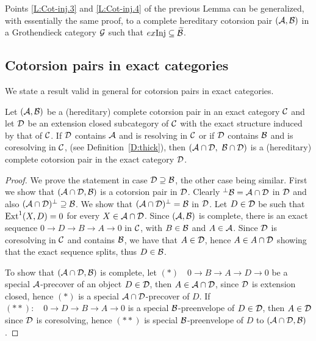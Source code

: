 Points \ref{L:Cot-inj.3} and \ref{L:Cot-inj.4} of the previous Lemma can be generalized, with essentially the same proof, to a complete hereditary cotorsion pair $(\mathcal{A},\mathcal{B})$ in a Grothendieck category $\mathcal{G}$ such that $ex \mathrm{Inj}\subseteq \widetilde{\mathcal{B}}$.

%
%
%
%
%
%
%
%
%
%
%
%
%
%
%
%


 \subsection{Cotorsion pairs in exact categories}

 We state a result valid in general for cotorsion pairs in exact categories.
 \begin{prop}\label{P:inducing} Let $(\mathcal{A}, \mathcal{B})$ be a (hereditary) complete cotorsion pair in an exact category $\mathcal{C}$ and let $\mathcal{D}$ be an extension closed subcategory of $\mathcal{C}$ with the exact structure induced by that of $\mathcal{C}$. If $\mathcal{D}$ contains $\mathcal{A}$ and is resolving in $\mathcal{C}$ or if $\mathcal{D}$ contains $\mathcal{B}$ and is coresolving in $\mathcal{C}$, (see Definition~\ref{D:thick}), then $(\mathcal{A}\cap\mathcal{D}, \ \mathcal{B}\cap\mathcal{D})$ is a (hereditary) complete cotorsion pair in the exact category $\mathcal{D}$.

 \end{prop}
 \begin{proof} We prove the statement in  case $\mathcal{D}\supseteq \mathcal{B}$, the other case being similar. First we show that $(\mathcal{A}\cap\mathcal{D}, \mathcal{B})$ is a cotorsion pair in $\mathcal{D}$.
 Clearly ${}^\perp{}\mathcal{B}= \mathcal{A}\cap \mathcal{D}$ in $\mathcal{D}$ and also $(\mathcal{A}\cap \mathcal{D}){}^\perp{} \supseteq \mathcal{B}$. We show that $(\mathcal{A}\cap \mathcal{D}){}^\perp{} =\mathcal{B}$ in $\mathcal{D}$.
 Let $D\in \mathcal{D}$ be such that $\operatorname{Ext}^1(X, D)=0$ for every $X\in \mathcal{A}\cap \mathcal{D}$. Since $(\mathcal{A}, \mathcal{B})$ is complete, there is an exact sequence $0\to D\to B\to A\to 0$ in $\mathcal{C}$, with $B\in \mathcal{B}$ and $A\in \mathcal{A}$. Since $\mathcal{D}$ is coresolving  in $\mathcal{C}$ and contains $\mathcal{B}$, we have that $A\in \mathcal{D}$, hence $A\in A\cap\mathcal{D}$ showing that the exact sequence splits, thus $D\in \mathcal{B}$.

 \begin{sloppypar}
To show that $(\mathcal{A}\cap\mathcal{D}, \mathcal{B})$ is complete, let ${(\ast)\quad 0\to B\to A\to D\to 0}$ be a special $\mathcal{A} $-precover of an object $D\in \mathcal{D}$, then $A\in \mathcal{A}\cap\mathcal{D}$, since $\mathcal{D}$ is extension closed, hence $(\ast)$ is a special $\mathcal{A}\cap \mathcal{D} $-precover of $D$. If $ (\ast\ast):\quad 0\to D\to B\to A\to 0$ is a special $\mathcal{B} $-preenvelope of $D\in \mathcal{D}$, then $A\in \mathcal{D}$ since $\mathcal{D}$ is coresolving, hence $(\ast\ast)$ is  special $\mathcal{B}$-preenvelope of $D$ \wrt to  $(\mathcal{A}\cap\mathcal{D}, \mathcal{B})$.
\end{sloppypar}
\end{proof}


